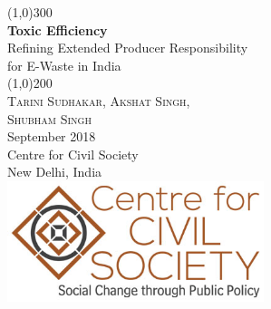 \documentclass[a4paper, 12pt]{article}
\begin{document}
                    
                    \begin{titlepage}
                    	\begin{center}
                    	\line(1,0){300}\\
                    	[0.25in]
                    	\huge{\bfseries \textcolor{CCSbrown} {Toxic Efficiency}} \\
    	[0.5cm]
    	\large  {Refining Extended Producer Responsibility \\ for E-Waste in India} \\
    	
                    	\line(1,0){200}\\
                    	[1in]
                    	\textsc{\huge Tarini Sudhakar, Akshat Singh,\\ Shubham Singh} \\
                    	[1.5cm]
                    	{\Large September 2018} \\
                    	[2.0cm]
                    	{\LARGE Centre for Civil Society} \\
                    	[0.1mm]
                    	{\Large New Delhi, India} \\
    	[2.0cm]
    	 \includegraphics[width = 75mm]{CCSlogo.jpg}
      
                    	\end{center}
                    \end{titlepage}
                    \tableofcontents
                    
                   \newpage
         
\end{document}
